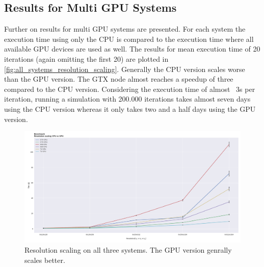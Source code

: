 \documentclass[master.tex]{subfiles}
\begin{document}
\subsection{Results for Multi GPU Systems}
Further on results for multi GPU systems are presented. For each system the execution time using only the CPU is compared to the execution time where all available GPU devices are used as well. The results for mean execution time of 20 iterations (again omitting the first 20) are plotted in \autoref{fig:all_systems_resolution_scaling}. Generally the CPU version scales worse than the GPU version. The GTX node almost reaches a speedup of three compared to the CPU version. Considering the execution time of almost ~3s per iteration, running a simulation with 200.000 iterations takes 
almost seven days using the CPU version whereas it only takes two and a half days using the GPU version. 
\begin{figure}[!hbtp]
    \centering
    \includegraphics[width=\linewidth]{pdfs/all_systems_compared.pdf}
    \caption{\small Resolution scaling on all three systems. The GPU version genrally scales better.}
    \label{fig:all_systems_resolution_scaling}
\end{figure}
\end{document}
